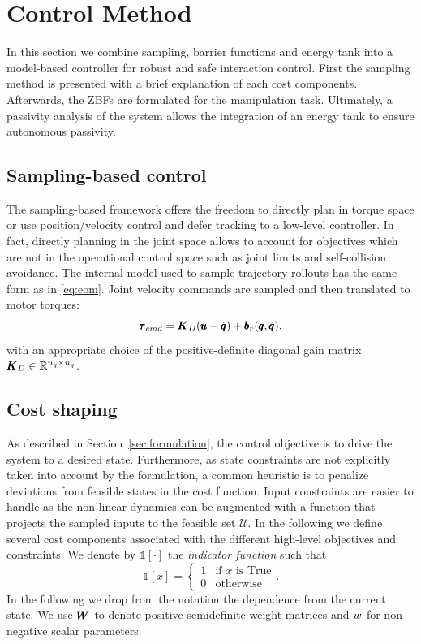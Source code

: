 \section{Control Method} \label{sec:control_method}

In this section we combine sampling, barrier functions and energy tank into a model-based controller for robust and safe interaction control. First the sampling method is presented with a brief explanation of each cost components. Afterwards, the ZBFs are formulated for the manipulation task. Ultimately, a passivity analysis of the system allows the integration of an energy tank to ensure autonomous passivity. 

\subsection{Sampling-based control}
The sampling-based framework offers the freedom to directly plan in torque space or use position/velocity control and defer tracking to a low-level controller. In fact, directly planning in the joint space allows to account for objectives which are not in the operational control space such as joint limits and self-collision avoidance. The internal model used to sample trajectory rollouts has the same form as in \eqn \ref{eq:eom}. Joint velocity commands are sampled and then translated to motor torques:
\begin{equation}
    \pmb{\tau}_{cmd} = \pmb{K}_{D} (\pmb{u} - \dot{\pmb{q}}) + \pmb{b}_{r}(\pmb{q}, \dot{\pmb{q}}),
\end{equation}
with an appropriate choice of the positive-definite diagonal gain matrix $\pmb{K}_{D} \in \mathbb{R}^{n_q\times n_q}$. 

\subsection{Cost shaping}
As described in Section~\ref{sec:formulation}, the control objective is to drive the system to a desired state. Furthermore, as state constraints are not explicitly taken into account by the formulation, a common heuristic is to penalize deviations from feasible states in the cost function. Input constraints are easier to handle as the non-linear dynamics can be augmented with a function that projects the sampled inputs to the feasible set $\mathcal{U}$. In the following we define several cost components associated with the different high-level objectives and constraints.
We denote by $\mathds{1}[\cdot]$ the \textit{indicator function} such that
\begin{equation}
    \mathds{1}[x] = 
    \begin{cases}
    1 & \text{if } x \text{ is True} \\
    0 & \text{otherwise}
    \end{cases}.
\end{equation}
In the following we drop from the notation the dependence from the current state. We use $\pmb{W}_{}$ to denote positive semidefinite weight matrices and $w_{}$ for non negative scalar parameters. 

